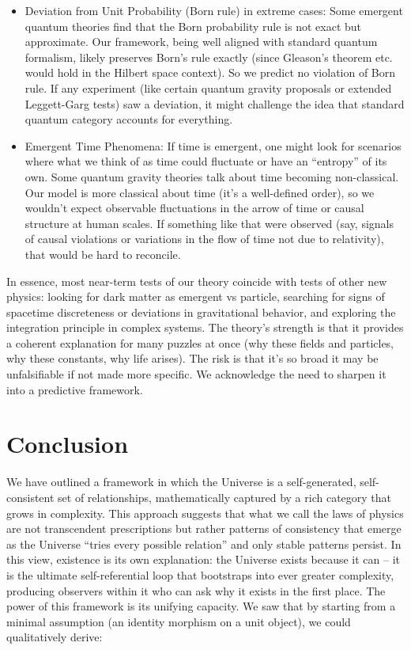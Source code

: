\documentclass{article}
\begin{document}
\begin{itemize}
\item Deviation from Unit Probability (Born rule) in extreme cases: Some emergent quantum theories find that the Born probability rule is not exact but approximate. Our framework, being well aligned with standard quantum formalism, likely preserves Born’s rule exactly (since Gleason’s theorem etc. would hold in the Hilbert space context). So we predict no violation of Born rule. If any experiment (like certain quantum gravity proposals or extended Leggett-Garg tests) saw a deviation, it might challenge the idea that standard quantum category accounts for everything.
\item Emergent Time Phenomena: If time is emergent, one might look for scenarios where what we think of as time could fluctuate or have an “entropy” of its own. Some quantum gravity theories talk about time becoming non-classical. Our model is more classical about time (it’s a well-defined order), so we wouldn’t expect observable fluctuations in the arrow of time or causal structure at human scales. If something like that were observed (say, signals of causal violations or variations in the flow of time not due to relativity), that would be hard to reconcile.
\end{itemize}

In essence, most near-term tests of our theory coincide with tests of other new physics: looking for dark matter as emergent vs particle, searching for signs of spacetime discreteness or deviations in gravitational behavior, and exploring the integration principle in complex systems. The theory’s strength is that it provides a coherent explanation for many puzzles at once (why these fields and particles, why these constants, why life arises). The risk is that it’s so broad it may be unfalsifiable if not made more specific. We acknowledge the need to sharpen it into a predictive framework.

\section{Conclusion}

We have outlined a framework in which the Universe is a self-generated, self-consistent set of relationships, mathematically captured by a rich category that grows in complexity. This approach suggests that what we call the laws of physics are not transcendent prescriptions but rather patterns of consistency that emerge as the Universe “tries every possible relation” and only stable patterns persist. In this view, existence is its own explanation: the Universe exists because it can – it is the ultimate self-referential loop that bootstraps into ever greater complexity, producing observers within it who can ask why it exists in the first place. The power of this framework is its unifying capacity. We saw that by starting from a minimal assumption (an identity morphism on a unit object), we could qualitatively derive:
\end{document}
